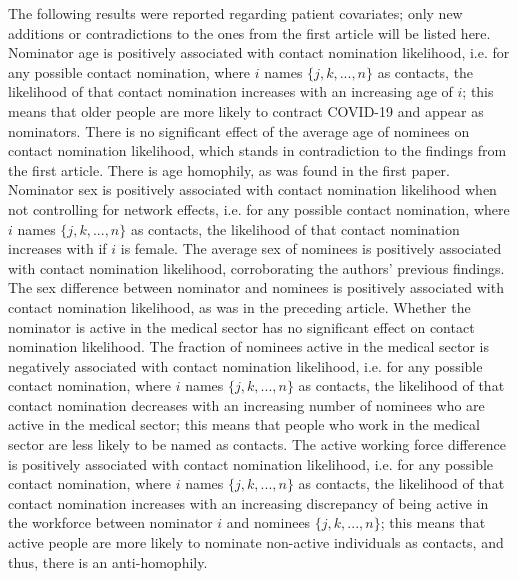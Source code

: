 The following results were reported regarding patient covariates; only new additions or contradictions to the ones from the first article will be listed here. Nominator age is positively associated with contact nomination likelihood, i.e. for any possible contact nomination, where $i$ names $\{j,k,...,n\}$ as contacts, the likelihood of that contact nomination increases with an increasing age of $i$; this means that older people are more likely to contract COVID-19 and appear as nominators. There is no significant effect of the average age of nominees on contact nomination likelihood, which stands in contradiction to the findings from the first article. There is age homophily, as was found in the first paper. Nominator sex is positively associated with contact nomination likelihood when not controlling for network effects, i.e. for any possible contact nomination, where $i$ names $\{j,k,...,n\}$ as contacts, the likelihood of that contact nomination increases with if $i$ is female. The average sex of nominees is positively associated with contact nomination likelihood, corroborating the authors' previous findings. The sex difference between nominator and nominees is positively associated with contact nomination likelihood, as was in the preceding article. Whether the nominator is active in the medical sector has no significant effect on contact nomination likelihood. The fraction of nominees active in the medical sector is negatively associated with contact nomination likelihood, i.e. for any possible contact nomination, where $i$ names $\{j,k,...,n\}$ as contacts, the likelihood of that contact nomination decreases with an increasing number of nominees who are active in the medical sector; this means that people who work in the medical sector are less likely to be named as contacts. The active working force difference is positively associated with contact nomination likelihood, i.e. for any possible contact nomination, where $i$ names $\{j,k,...,n\}$ as contacts, the likelihood of that contact nomination increases with an increasing discrepancy of being active in the workforce between nominator $i$ and nominees $\{j,k,...,n\}$; this means that active people are more likely to nominate non-active individuals as contacts, and thus, there is an anti-homophily. 

